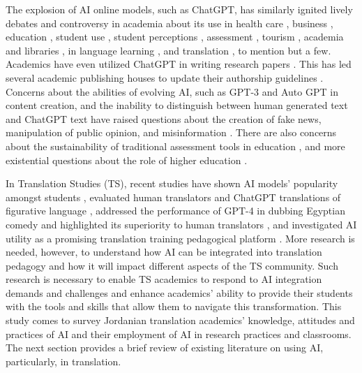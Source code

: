 \documentclass[english]{textolivre}
\begin{document}
The explosion of AI online models, such as ChatGPT, has similarly ignited lively debates and controversy in academia about its use in health care \cite{kitamura2023}, business \cite{george2023}, education \cite{lo2023}, student use \cite{cotton2023}, student perceptions \cite{chan2023}, assessment \cite{smolansky2023}, tourism \cite{ali2023}, academia and libraries \cite{lund2023}, in language learning \cite{hong2023}, and translation \cite{sahari2024, shi2025}, to mention but a few. Academics have even utilized ChatGPT in writing research papers \cite{oconnor2023}. This has led several academic publishing houses to update their authorship guidelines \cite{elsevier2023, taylorfrancis2023}. Concerns about the abilities of evolving AI, such as GPT-3 and Auto GPT in content creation, and the inability to distinguish between human generated text and ChatGPT text have raised questions about the creation of fake news, manipulation of public opinion, and misinformation \cite{floridi2020}. There are also concerns about the sustainability of traditional assessment tools in education \cite{rudolph2023, stokel-walker2022}, and more existential questions about the role of higher education \cite{kramm2023}.

In Translation Studies (TS), recent studies have shown AI models’ popularity amongst students \cite{sahari2023}, evaluated human translators and ChatGPT translations of figurative language \cite{sahari2024}, addressed the performance of GPT-4 in dubbing Egyptian comedy and highlighted its superiority to human translators \cite{abu-rayyash2024}, and investigated AI utility as a promising translation training pedagogical platform \cite{xu2025}. More research is needed, however, to understand how AI can be integrated into translation pedagogy and how it will impact different aspects of the TS community. Such research is necessary to enable TS academics to respond to AI integration demands and challenges and enhance academics’ ability to provide their students with the tools and skills that allow them to navigate this transformation. This study comes to survey Jordanian translation academics’ knowledge, attitudes and practices of AI and their employment of AI in research practices and classrooms. The next section provides a brief review of existing literature on using AI, particularly, in translation.
\end{document}
